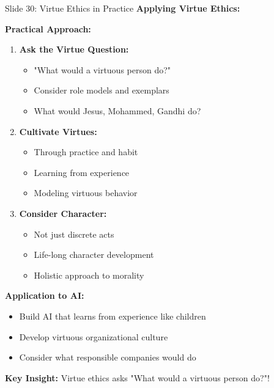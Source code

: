 \documentclass[8pt]{beamer}
\begin{document}
	\begin{frame}{Slide 30: Virtue Ethics in Practice}
		\fontsize{6.5}{7.5}\selectfont
		\textbf{Applying Virtue Ethics:}
		
		\vspace{0.1cm}
		\textbf{Practical Approach:}
		\begin{enumerate}
			\item \textbf{Ask the Virtue Question:}
			\begin{itemize}
				\item "What would a virtuous person do?"
				\item Consider role models and exemplars
				\item What would Jesus, Mohammed, Gandhi do?
			\end{itemize}
			\item \textbf{Cultivate Virtues:}
			\begin{itemize}
				\item Through practice and habit
				\item Learning from experience
				\item Modeling virtuous behavior
			\end{itemize}
			\item \textbf{Consider Character:}
			\begin{itemize}
				\item Not just discrete acts
				\item Life-long character development
				\item Holistic approach to morality
			\end{itemize}
		\end{enumerate}
		
		\vspace{0.1cm}
		\textbf{Application to AI:}
		\begin{itemize}
			\item Build AI that learns from experience like children
			\item Develop virtuous organizational culture
			\item Consider what responsible companies would do
		\end{itemize}
		
		\textcolor{myblue}{\textbf{Key Insight:}} Virtue ethics asks \textcolor{myblue}{"What would a virtuous person do?"}!
	\end{frame}
	
\end{document}
